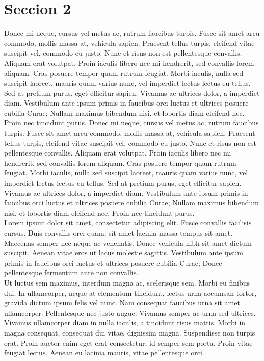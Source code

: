 \section{Seccion 2}

Donec mi neque, cursus vel metus ac, rutrum faucibus turpis. Fusce sit amet arcu commodo, mollis massa at, vehicula sapien. Praesent tellus turpis, eleifend vitae suscipit vel, commodo eu justo. Nunc et risus non est pellentesque convallis. Aliquam erat volutpat. Proin iaculis libero nec mi hendrerit, sed convallis lorem aliquam. Cras posuere tempor quam rutrum feugiat. Morbi iaculis, nulla sed suscipit laoreet, mauris quam varius nunc, vel imperdiet lectus lectus eu tellus. Sed at pretium purus, eget efficitur sapien. Vivamus ac ultrices dolor, a imperdiet diam. Vestibulum ante ipsum primis in faucibus orci luctus et ultrices posuere cubilia Curae; Nullam maximus bibendum nisi, et lobortis diam eleifend nec. Proin nec tincidunt purus. 
Donec mi neque, cursus vel metus ac, rutrum faucibus turpis. Fusce sit amet arcu commodo, mollis massa at, vehicula sapien. Praesent tellus turpis, eleifend vitae suscipit vel, commodo eu justo. Nunc et risus non est pellentesque convallis. Aliquam erat volutpat. Proin iaculis libero nec mi hendrerit, sed convallis lorem aliquam. Cras posuere tempor quam rutrum feugiat. Morbi iaculis, nulla sed suscipit laoreet, mauris quam varius nunc, vel imperdiet lectus lectus eu tellus. Sed at pretium purus, eget efficitur sapien. Vivamus ac ultrices dolor, a imperdiet diam. Vestibulum ante ipsum primis in faucibus orci luctus et ultrices posuere cubilia Curae; Nullam maximus bibendum nisi, et lobortis diam eleifend nec. Proin nec tincidunt purus.
\\


Lorem ipsum dolor sit amet, consectetur adipiscing elit. Fusce convallis facilisis cursus. Duis convallis orci quam, sit amet lacinia massa tempus sit amet. Maecenas semper nec neque ac venenatis. Donec vehicula nibh sit amet dictum suscipit. Aenean vitae eros ut lacus molestie sagittis. Vestibulum ante ipsum primis in faucibus orci luctus et ultrices posuere cubilia Curae; Donec pellentesque fermentum ante non convallis.
\\

Ut luctus sem maximus, interdum magna ac, scelerisque sem. Morbi eu finibus dui. In ullamcorper, neque at elementum tincidunt, lectus urna accumsan tortor, gravida dictum ipsum felis vel nunc. Nam consequat faucibus urna sit amet ullamcorper. Pellentesque nec justo augue. Vivamus semper ac urna sed ultrices. Vivamus ullamcorper diam in nulla iaculis, a tincidunt risus mattis. Morbi in magna consequat, consequat dui vitae, dignissim magna. Suspendisse non turpis erat. Proin auctor enim eget erat consectetur, id semper sem porta. Proin vitae feugiat lectus. Aenean eu lacinia mauris, vitae pellentesque orci.
\\

